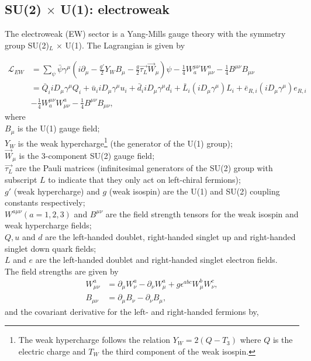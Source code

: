 \subsection{SU(2) $\times$ U(1): electroweak}
\label{subsec:ew}
The electroweak (EW) sector is a Yang-Mills gauge theory with the symmetry group SU(2)$_L$ $\times$ U(1). The Lagrangian is given by

\begin{equation}
\label{eq:EW}
\begin{split}
\mathcal{L}_{EW} &= \sum_{\psi} \bar{\psi} \gamma^\mu \left(i\partial_\mu -  \frac{g'}{2}Y_W B_\mu - \frac{g}{2} \overrightarrow{\tau_L} \overrightarrow{W}_\mu \right) \psi - \frac{1}{4} W^{\mu\nu}_a W^{a}_{\mu\nu} -\frac{1}{4} B^{\mu\nu} B_{\mu\nu} \\ 
&= \bar{Q}_i i D_\mu \gamma^\mu Q_i + \bar{u}_i i D_\mu \gamma^\mu u_i + \bar{d}_i i D_\mu \gamma^\mu d_i + \bar{L}_i\left(iD_\mu\gamma^\mu\right)L_i + \bar{e}_{R,i}\left(iD_\mu\gamma^\mu\right)e_{R,i} \\ &
- \frac{1}{4} W^{\mu\nu}_a W^{a}_{\mu\nu} -\frac{1}{4} B^{\mu\nu} B_{\mu\nu},
\end{split}
\end{equation}
where\\
\indent $B_\mu$ is the U(1) gauge field;\\
\indent $Y_W$ is the weak hypercharge\footnote{The weak hypercharge follows the relation $Y_W = 2\left(Q-T_3\right)$ where $Q$ is the electric charge and $T_W$ the third component of the weak isospin.} (the generator of the U(1) group);\\
\indent $\overrightarrow{W}_\mu$ is the 3-component SU(2) gauge field;\\
\indent $\overrightarrow{\tau_L}$ are the Pauli matrices (infinitesimal generators of the SU(2) group with subscript $L$ to indicate that they only act on left-chiral fermions);\\
\indent $g'$ (weak hypercharge) and $g$ (weak isospin) are the U(1) and SU(2) coupling constants respectively;\\
\indent $W^{a\mu\nu} (a=1,2,3)$ and $B^{\mu\nu}$ are the field strength tensors for the weak isospin and weak hypercharge fields;\\
\indent $Q, u$ and $d$ are the left-handed doublet, right-handed singlet up and right-handed singlet down quark fields;\\
\indent $L$ and $e$ are the left-handed doublet and right-handed singlet electron fields.
\\
The field strengths are given by
\begin{equation*}
\begin{split}
W^a_{\mu\nu} &= \partial_\mu W^a_\nu - \partial_\nu W^a_\mu + g \epsilon^{abc}W^b_\mu W^c_\nu,\\
B_{\mu\nu} &= \partial_\mu B_\nu - \partial_\nu B_\mu,
\end{split}
\end{equation*}
\noindent and the covariant derivative for the left- and right-handed fermions by,

